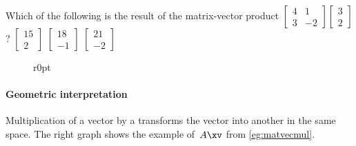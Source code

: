 \begin{activity}
Which of the following is the result of the matrix-vector product
\(\begin{bmatrix} 4&1\\3&-2 \end{bmatrix}\begin{bmatrix} 3\\2 \end{bmatrix}\)?
{\(\begin{bmatrix} 15\\2 \end{bmatrix}\)}
{\(\begin{bmatrix} 18\\-1 \end{bmatrix}\)}
{\(\begin{bmatrix} 21\\-2 \end{bmatrix}\)}
\end{activity}



\begin{figure}r{0pt}
\end{figure}
\paragraph{Geometric interpretation}
Multiplication of a vector by a \emph{} transforms the vector into another in the same space. 
The right graph shows the example of~\(A\xv\) from \cref{eg:matvecmul}.

